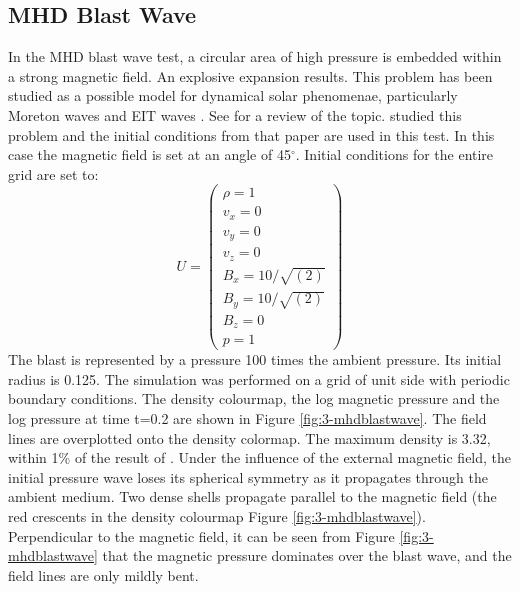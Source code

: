 \subsection{MHD Blast Wave}
In the MHD blast wave test, a circular area of high pressure is embedded within a strong magnetic field.
An explosive expansion results.
This problem has been studied as a possible model for dynamical solar
phenomenae, particularly Moreton waves and EIT waves \citep{2002ApJ...572L..99C}. See 
\citet{1999SoPh..187...89C} for a review of the topic.
\citet{Gardiner05:_an_uns} studied this problem and the initial conditions from
that paper are used in this test.
In this case the magnetic field is set at an angle of 45$^\circ$.
Initial conditions for the entire grid are set to: 
\begin{equation}
U = \left( 
\begin{array}{c}
\rho = 1 \\
v_x = 0\\
v_y = 0\\
v_z = 0\\
B_x = 10/\sqrt{(2)}\\
B_y = 10/\sqrt{(2)}\\
B_z = 0\\
p = 1
\end{array}
\right)
\end{equation}
The blast is represented by a pressure 100 times the ambient pressure.
Its initial radius is 0.125. 
The simulation was performed on a grid of unit side with periodic boundary conditions. 
The density colourmap, the log magnetic pressure and the log pressure at time
t=0.2 are shown in Figure \ref{fig:3-mhdblastwave}.
The field lines are overplotted onto the density colormap.
The maximum density is 3.32, within 1\% of the result of \citet{Gardiner05:_an_uns}.
Under the influence of the external magnetic field, the initial pressure wave
loses its spherical symmetry as it propagates through the ambient medium.
Two dense shells propagate parallel to the magnetic field (the red crescents in
the density colourmap Figure \ref{fig:3-mhdblastwave}).
Perpendicular to the magnetic field, it can be seen from Figure
\ref{fig:3-mhdblastwave} that the magnetic pressure dominates over the
blast wave, and the field lines are only mildly bent.

